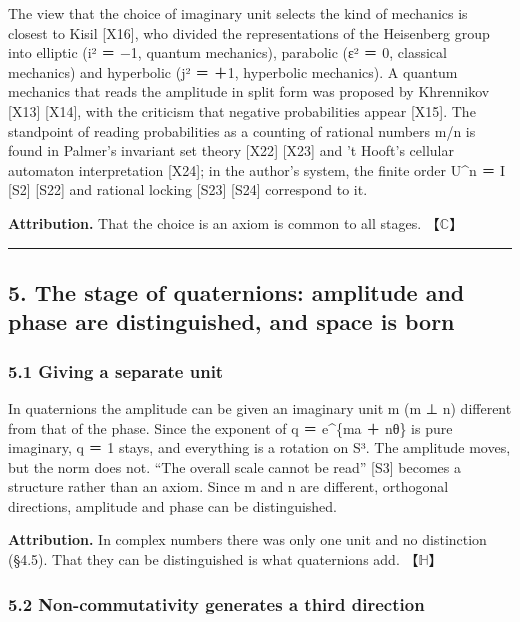 \documentclass[
  a4paper,
]{article}
\begin{document}
The view that the choice of imaginary unit selects the kind of mechanics
is closest to Kisil {[}X16{]}, who divided the representations of the
Heisenberg group into elliptic (i² ＝ −1, quantum mechanics), parabolic
(ε² ＝ 0, classical mechanics) and hyperbolic (j² ＝ ＋1, hyperbolic
mechanics). A quantum mechanics that reads the amplitude in split form
was proposed by Khrennikov {[}X13{]} {[}X14{]}, with the criticism that
negative probabilities appear {[}X15{]}. The standpoint of reading
probabilities as a counting of rational numbers m/n is found in Palmer's
invariant set theory {[}X22{]} {[}X23{]} and 't Hooft's cellular
automaton interpretation {[}X24{]}; in the author's system, the finite
order U\^{}n ＝ I {[}S2{]} {[}S22{]} and rational locking {[}S23{]}
{[}S24{]} correspond to it.

\textbf{Attribution.} That the choice is an axiom is common to all
stages. 【\(\mathbb{C}\)】

\begin{center}\rule{0.5\linewidth}{0.5pt}\end{center}

\subsection{5. The stage of quaternions: amplitude and phase are
distinguished, and space is
born}\label{the-stage-of-quaternions-amplitude-and-phase-are-distinguished-and-space-is-born}

\subsubsection{5.1 Giving a separate unit}\label{giving-a-separate-unit}

In quaternions the amplitude can be given an imaginary unit m (m ⊥ n)
different from that of the phase. Since the exponent of q ＝ e\^{}\{ma
＋ nθ\} is pure imaginary, \textbar q\textbar{} ＝ 1 stays, and
everything is a rotation on S³. The amplitude moves, but the norm does
not. ``The overall scale cannot be read'' {[}S3{]} becomes a structure
rather than an axiom. Since m and n are different, orthogonal
directions, amplitude and phase can be distinguished.

\textbf{Attribution.} In complex numbers there was only one unit and no
distinction (§4.5). That they can be distinguished is what quaternions
add. 【\(\mathbb{H}\)】

\subsubsection{5.2 Non-commutativity generates a third
direction}\label{non-commutativity-generates-a-third-direction}
\end{document}

